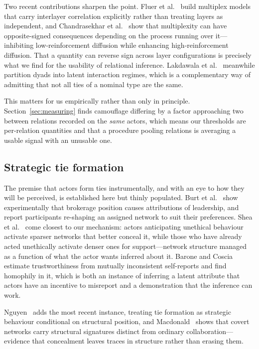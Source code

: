 \documentclass[../elsevier.tex]{subfiles}
\begin{document}
Two recent contributions sharpen the point. Fluer et
al.~\citeyearpar{fluer2026survey} build multiplex models that carry interlayer
correlation explicitly rather than treating layers as independent, and Chandrasekhar et
al.~\citeyearpar{chandrasekhar2026multiplexing} show that multiplexity can have
opposite-signed consequences depending on the process running over it---inhibiting
low-reinforcement diffusion while enhancing high-reinforcement diffusion. That a
quantity can reverse sign across layer configurations is precisely what we find for the
usability of relational inference. Lakdawala et
al.~\citeyearpar{lakdawala2026bonds} meanwhile partition dyads into latent interaction
regimes, which is a complementary way of admitting that not all ties of a nominal type
are the same.

This matters for us empirically rather than only in principle.
Section~\ref{sec:measuring} finds camouflage differing by a factor approaching two
between relations recorded on the \emph{same} actors, which means our thresholds are
per-relation quantities and that a procedure pooling relations is averaging a usable
signal with an unusable one.

\subsection{Strategic tie formation}
\label{sec:related-strategic}

The premise that actors form ties instrumentally, and with an eye to how they will be
perceived, is established here but thinly populated. Burt et al.~\citeyearpar{burt2021network}
show experimentally that brokerage position causes attributions of leadership, and
report participants re-shaping an assigned network to suit their preferences. Shea et
al.~\citeyearpar{shea2019cheater} come closest to our mechanism: actors anticipating
unethical behaviour activate sparser networks that better conceal it, while those who
have already acted unethically activate denser ones for support---network structure
managed as a function of what the actor wants inferred about it. Barone and
Coscia~\citeyearpar{barone2018birds} estimate trustworthiness from mutually inconsistent
self-reports and find homophily in it, which is both an instance of inferring a
latent attribute that actors have an incentive to misreport and a demonstration that
the inference can work.

Nguyen~\citeyearpar{nguyen2026agency} adds the most recent instance, treating tie
formation as strategic behaviour conditional on structural position, and
Macdonald~\citeyearpar{macdonald2026wiretap} shows that covert networks carry
structural signatures distinct from ordinary collaboration---evidence that concealment
leaves traces in structure rather than erasing them.
\end{document}
